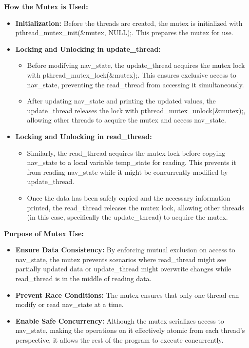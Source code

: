 \documentclass[a4paper,11pt]{article}%
\newenvironment{qanda}{\setlength{\parindent}{0pt}}{\bigskip}
\begin{document}
\begin{qanda}
\begin{enumerate}
\begin{enumerate}
				      \textbf{How the Mutex is Used:}
					  \begin{itemize}
						\item \textbf{Initialization:} Before the threads are created, the mutex is initialized with pthread\_mutex\_init(\&mutex, NULL);. This prepares the mutex for use.
						\item \textbf{Locking and Unlocking in update\_thread:}
						\begin{itemize}
							\item Before modifying nav\_state, the update\_thread acquires the mutex lock with pthread\_mutex\_lock(\&mutex);. This ensures exclusive access to nav\_state, preventing the read\_thread from accessing it simultaneously.
							\item After updating nav\_state and printing the updated values, the update\_thread releases the lock with pthread\_mutex\_unlock(\&mutex);, allowing other threads to acquire the mutex and access nav\_state.
						\end{itemize}
						
						
						\item \textbf{Locking and Unlocking in read\_thread:}
						\begin{itemize}
							\item Similarly, the read\_thread acquires the mutex lock before copying nav\_state to a local variable temp\_state for reading. This prevents it from reading nav\_state while it might be concurrently modified by update\_thread.
							\item Once the data has been safely copied and the necessary information printed, the read\_thread releases the mutex lock, allowing other threads (in this case, specifically the update\_thread) to acquire the mutex.
						\end{itemize}
						
						
					  \end{itemize}
				      

				      
				      \textbf{Purpose of Mutex Use:}
					  \begin{itemize}
						\item \textbf{Ensure Data Consistency:} By enforcing mutual exclusion on access to nav\_state, the mutex prevents scenarios where read\_thread might see partially updated data or update\_thread might overwrite changes while read\_thread is in the middle of reading data.
						\item \textbf{Prevent Race Conditions:} The mutex ensures that only one thread can modify or read nav\_state at a time.
						\item \textbf{Enable Safe Concurrency:} Although the mutex serializes access to nav\_state, making the operations on it effectively atomic from each thread's perspective, it allows the rest of the program to execute concurrently.
					  \end{itemize}
				      


\end{enumerate}
\end{enumerate}
\end{qanda}
\end{document}
